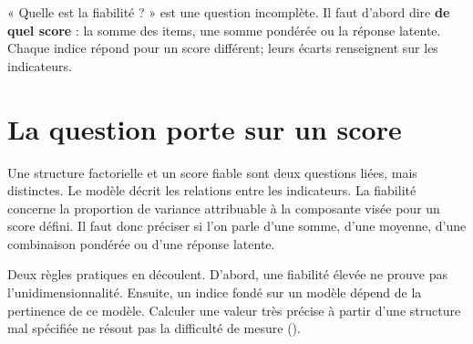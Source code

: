 \documentclass[
  french,
  11pt,
  a4paper,
  DIV=11,
  numbers=noendperiod]{scrreprt}
\begin{document}
\begin{tcolorbox}[enhanced jigsaw, arc=.35mm, bottomrule=.15mm, bottomtitle=1mm, breakable, colback=white, colbacktitle=quarto-callout-tip-color!10!white, colframe=quarto-callout-tip-color-frame, coltitle=black, left=2mm, leftrule=.75mm, opacityback=0, opacitybacktitle=0.6, rightrule=.15mm, title={Idée centrale}, titlerule=0mm, toprule=.15mm, toptitle=1mm]

« Quelle est la fiabilité ? » est une question incomplète. Il faut
d'abord dire \textbf{de quel score} : la somme des items, une somme
pondérée ou la réponse latente. Chaque indice répond pour un score
différent; leurs écarts renseignent sur les indicateurs.

\end{tcolorbox}

\section{La question porte sur un
score}\label{la-question-porte-sur-un-score}

Une structure factorielle et un score fiable sont deux questions liées,
mais distinctes. Le modèle décrit les relations entre les indicateurs.
La fiabilité concerne la proportion de variance attribuable à la
composante visée pour un score défini. Il faut donc préciser si l'on
parle d'une somme, d'une moyenne, d'une combinaison pondérée ou d'une
réponse latente.

Deux règles pratiques en découlent. D'abord, une fiabilité élevée ne
prouve pas l'unidimensionnalité. Ensuite, un indice fondé sur un modèle
dépend de la pertinence de ce modèle. Calculer une valeur très précise à
partir d'une structure mal spécifiée ne résout pas la difficulté de
mesure ().

\end{document}
